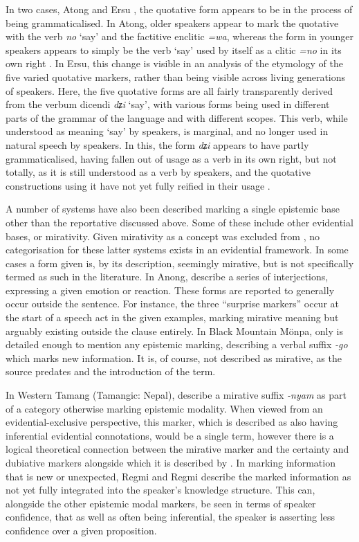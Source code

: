 In two cases, Atong \cite[Brahmaputran: India,][]{Breugel2014} and Ersu \cite[Ersuish: PRC,][]{Zhang2013}, the quotative form appears to be in the process of being grammaticalised. In Atong, older speakers appear to mark the quotative with the verb \textit{no} `say' and the factitive enclitic \textit{=wa}, whereas the form in younger speakers appears to simply be the verb `say' used by itself as a clitic \textit{=no} in its own right \cite[408]{Breugel2014}. In Ersu, this change is visible in an analysis of the etymology of the five varied quotative markers, rather than being visible across living generations of speakers. Here, the five quotative forms are all fairly transparently derived from the verbum dicendi \textit{dʑi} `say', with various forms being used in different parts of the grammar of the language and with different scopes. This verb, while understood as meaning `say' by speakers, is marginal, and no longer used in natural speech by speakers. In this, the form \textit{dʑi} appears to have partly grammaticalised, having fallen out of usage as a verb in its own right, but not totally, as it is still understood as a verb by speakers, and the quotative constructions using it have not yet fully reified in their usage \cite{Zhang2014}.

A number of systems have also been described marking a single epistemic base other than the reportative discussed above. Some of these include other evidential bases, or mirativity. Given mirativity as a concept was excluded from , no categorisation for these latter systems exists in an evidential framework. In some cases a form given is, by its description, seemingly mirative, but is not specifically termed as such in the literature. In Anong,  describe a series of interjections, expressing a given emotion or reaction. These forms are reported to generally occur outside the sentence. For instance, the three ``surprise markers'' \cite[111]{Sun2009} occur at the start of a speech act in the given examples, marking mirative meaning but arguably existing outside the clause entirely. In Black Mountain Mönpa, only  is detailed enough to mention any epistemic marking, describing a verbal suffix \textit{-go} which marks new information. It is, of course, not described as mirative, as the source predates  and the introduction of the term.

In Western Tamang (Tamangic: Nepal),  describe a mirative suffix \textit{-nyam} as part of a category otherwise marking epistemic modality. When viewed from an evidential-exclusive perspective, this marker, which is described as also having inferential evidential connotations, would be a single term, however there is a logical theoretical connection between the mirative marker and the certainty and dubiative markers alongside which it is described by . In marking information that is new or unexpected, Regmi and Regmi describe the marked information as not yet fully integrated into the speaker's knowledge structure. This can, alongside the other epistemic modal markers, be seen in terms of speaker confidence, that as well as often being inferential, the speaker is asserting less confidence over a given proposition.

